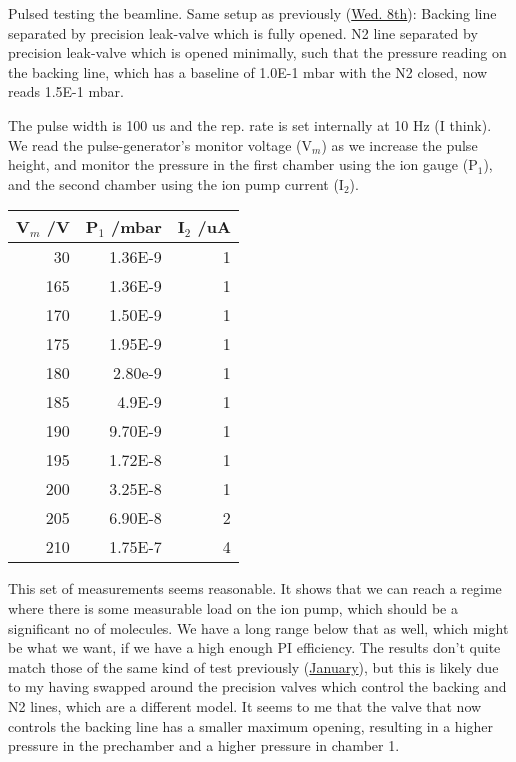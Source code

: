 \documentclass[11pt]{article}
\begin{document}
Pulsed testing the beamline. Same setup as previously (\hyperref[id-8e2fb259-908c-4369-9586-0ba023a357a6]{Wed. 8th}):
Backing line separated by precision leak-valve which is fully
opened. N2 line separated by precision leak-valve which is opened
minimally, such that the pressure reading on the backing line, which
has a baseline of 1.0E-1 mbar with the N2 closed, now reads 1.5E-1
mbar. 

The pulse width is 100 us and the rep. rate is set internally at 10
Hz (I think). We read the pulse-generator's monitor voltage (V$_m$) as we
increase the pulse height, and monitor the pressure in the first
chamber using the ion gauge (P$_1$), and the second chamber using the ion
pump current (I$_2$). 


\begin{center}
\begin{tabular}{rrr}
 V$_m$ /V  &  P$_1$ /mbar  &  I$_2$ /uA  \\
\hline
       30  &      1.36E-9  &          1  \\
      165  &      1.36E-9  &          1  \\
      170  &      1.50E-9  &          1  \\
      175  &      1.95E-9  &          1  \\
      180  &      2.80e-9  &          1  \\
      185  &       4.9E-9  &          1  \\
      190  &      9.70E-9  &          1  \\
      195  &      1.72E-8  &          1  \\
      200  &      3.25E-8  &          1  \\
      205  &      6.90E-8  &          2  \\
      210  &      1.75E-7  &          4  \\
\end{tabular}
\end{center}



This set of measurements seems reasonable. It shows that we can reach
a regime where there is some measurable load on the ion pump, which
should be a significant no of molecules. We have a long range below
that as well, which might be what we want, if we have a high enough PI
efficiency. The results don't quite match those of the same kind of
test previously (\hyperref[id-2e3d7b82-77d8-4e7f-82b9-6300c3e6dcfb]{January}), but this is likely due to my having swapped
around the precision valves which control the backing and N2 lines,
which are a different model. It seems to me that the valve that now
controls the backing line has a smaller maximum opening, resulting in
a higher pressure in the prechamber and a higher pressure in
chamber 1. 
\end{document}
